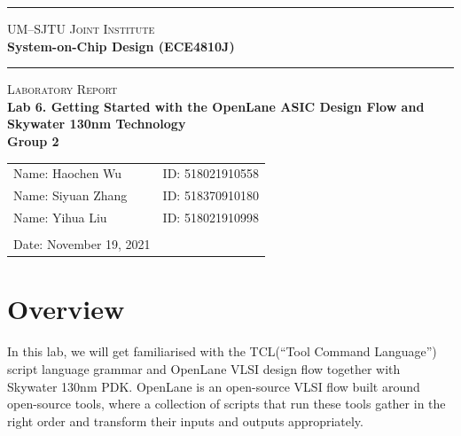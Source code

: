 \documentclass[a4paper]{article}
\begin{document}
\begin{titlepage}
    \vspace*{0.25cm}
    \noindent\rule[0.25\baselineskip]{\textwidth}{1pt}
    \begin{center}
        \huge{\textsc{UM--SJTU Joint Institute}}\vspace{0.3em}\\
        \huge{\textbf{System-on-Chip Design (ECE4810J)}}\vspace{0.3em}\\
        \noindent\rule[0.25\baselineskip]{\textwidth}{1pt}
    \end{center}
    \begin{center}
        \vspace{5cm}
        \Large{\textsc{Laboratory Report}}\vspace{0.5em}\\
        \Large{\textbf{Lab 6. Getting Started with the OpenLane ASIC Design Flow and Skywater 130nm Technology}}\vspace{1em}\\
        \Large{\textbf{Group 2}}\\
    \end{center}
    \vfill
    \large
    \begin{tabular}{ll}
        Name: Haochen Wu \hspace*{2em}&ID: 518021910558\hspace*{2em}\\
        Name: Siyuan Zhang \hspace*{2em}&ID: 518370910180 \hspace*{2em}\\
        Name: Yihua Liu \hspace*{2em}&ID: 518021910998\hspace*{2em}\\
        \\
        Date: November 19, 2021
    \end{tabular}
\end{titlepage}
\tableofcontents
\newpage
\section{Overview}
In this lab, we will get familiarised with the TCL(“Tool Command Language”) script language grammar and OpenLane VLSI design flow together with Skywater 130nm PDK. OpenLane is an open-source VLSI flow built around open-source tools,
where a collection of scripts that run these tools gather in the right order and transform their inputs
and outputs appropriately.
\end{document}
